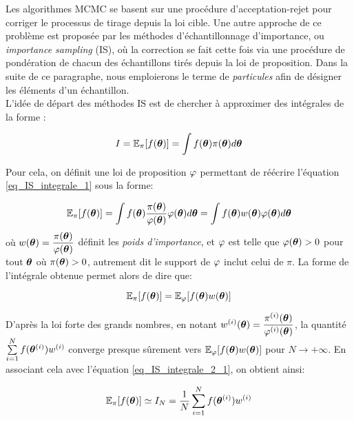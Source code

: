 {Les algorithmes MCMC se basent sur une procédure d'acceptation-rejet pour corriger le processus de tirage depuis la loi cible. Une autre approche de ce problème est proposée par les méthodes d'échantillonnage d'importance, ou \textit{importance sampling} (IS), où la correction se fait cette fois via une procédure de pondération de chacun des échantillons tirés depuis la loi de proposition.}
 Dans la suite de ce paragraphe, nous emploierons le terme de \textit{particules} afin de désigner les éléments d'un échantillon.\\
 
 L'idée de départ des méthodes IS est de chercher à approximer des intégrales de la forme : 
 
 \begin{equation}
	  I = \mathbb{E}_\pi[f({\bm{\theta}})] = \int f({\bm{\theta}})\pi({\bm{\theta}})d{\bm{\theta}}
	  \label{eq_IS_integrale_1}
 \end{equation}
 
 Pour cela, on définit une loi de proposition ${\varphi}$ permettant de réécrire l'équation \eqref{eq_IS_integrale_1} sous la forme:
 
 \begin{equation}
	\mathbb{E}_\pi[f({\bm{\theta}})] = \int  f({\bm{\theta}}) \dfrac{\pi({\bm{\theta}})}{{\varphi}({\bm{\theta}})}{\varphi}({\bm{\theta}})d{\bm{\theta}} = \int  f({\bm{\theta}}) w({\bm{\theta}}) {\varphi}({\bm{\theta}})d{\bm{\theta}} 
	\label{eq_IS_integrale_2}
 \end{equation}
 où $w({\bm{\theta}}) = \dfrac{\pi({\bm{\theta}})}{{\varphi}({\bm{\theta}})}$ {définit les \textit{poids d'importance}, et ${\varphi}$ est telle que ${\varphi}({\bm{\theta}}) >0 $ pour tout ${\bm{\theta}}$ où $\pi({\bm{\theta}}) > 0$, autrement dit le support de ${\varphi}$ inclut celui de $\pi$. } La forme de l'intégrale obtenue permet alors de dire que:
 
\begin{equation}
	\mathbb{E}_\pi[f({\bm{\theta}})] = \mathbb{E}_{\varphi}[f({\bm{\theta}})w({\bm{\theta}})] 
	\label{eq_IS_integrale_2_1}
\end{equation}

D'après la loi forte des grands nombres, {en notant $w^{(i)}({\bm{\theta}}) = \dfrac{\pi^{(i)}({\bm{\theta}})}{{\varphi}^{(i)}({\bm{\theta}})}$, la quantité} $\sum\limits_{i=1}^N f({\bm{\theta}}^{(i)}) w^{(i)}$ converge presque sûrement vers  $\mathbb{E}_\varphi[f({\bm{\theta}})w({\bm{\theta}})]$ pour $N \rightarrow + \infty$. En associant cela avec l'équation \eqref{eq_IS_integrale_2_1}, on obtient ainsi:
 
 \begin{equation}
	 \mathbb{E}_\pi[f({\bm{\theta}})] \simeq I_N = \dfrac{1}{N}\sum\limits_{i=1}^N f({\bm{\theta}}^{(i)})  w^{(i)}
	 \label{eq_IS_integrale_3}
 \end{equation}
 
